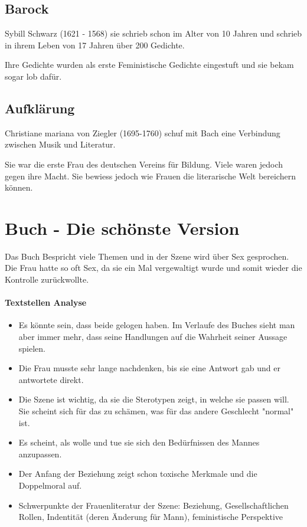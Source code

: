\documentclass{article}
\begin{document}
\subsection{Barock}
Sybill Schwarz (1621 - 1568) sie schrieb schon im Alter von 10 Jahren und schrieb in ihrem Leben von 17 Jahren über 200 Gedichte.

Ihre Gedichte wurden als erste Feministische Gedichte eingestuft und sie bekam sogar lob dafür.

\subsection{Aufklärung}
Christiane mariana von Ziegler (1695-1760) schuf mit Bach eine Verbindung zwischen Musik und Literatur.

Sie war die erste Frau des deutschen Vereins für Bildung. Viele waren jedoch gegen ihre Macht. Sie bewiess jedoch wie Frauen die literarische Welt bereichern können.

\newpage
\section{Buch - Die schönste Version}
Das Buch Bespricht viele Themen und in der Szene wird über Sex gesprochen. Die Frau hatte so oft Sex, da sie ein Mal vergewaltigt wurde und somit wieder die Kontrolle zurückwollte.

\paragraph{Textstellen Analyse}
\begin{itemize}
    \item Es könnte sein, dass beide gelogen haben. Im Verlaufe des Buches sieht man aber immer mehr, dass seine Handlungen auf die Wahrheit seiner Aussage spielen.
    \item Die Frau musste sehr lange nachdenken, bis sie eine Antwort gab und er antwortete direkt.
    \item Die Szene ist wichtig, da sie die Sterotypen zeigt, in welche sie passen will. Sie scheint sich für das zu schämen, was für das andere Geschlecht "normal" ist.
    \item Es scheint, als wolle und tue sie sich den Bedürfnissen des Mannes anzupassen.
    \item Der Anfang der Beziehung zeigt schon toxische Merkmale und die Doppelmoral auf.
    \item Schwerpunkte der Frauenliteratur der Szene: Beziehung, Gesellschaftlichen Rollen, Indentität (deren Änderung für Mann), feministische Perspektive
\end{itemize}

\end{document}

